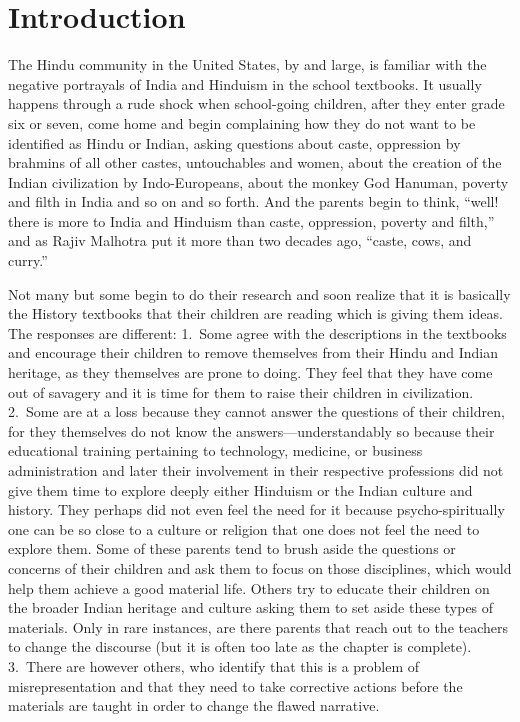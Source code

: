 \chapter*{Introduction}


The Hindu community in the United States, by and large, is familiar with the negative portrayals of India and Hinduism in the school textbooks. It usually happens through a rude shock when school-going children, after they enter grade six or seven, come home and begin complaining how they do not want to be identified as Hindu or Indian, asking questions about caste, oppression by brahmins of all other castes, untouchables and women, about the creation of the Indian civilization by Indo-Europeans, about the monkey God Hanuman, poverty and filth in India and so on and so forth. And the parents begin to think, “well! there is more to India and Hinduism than caste, oppression, poverty and filth,” and as Rajiv Malhotra put it more than two decades ago, “caste, cows, and curry.”

Not many but some begin to do their research and soon realize that it is basically the History textbooks that their children are reading which is giving them ideas. The responses are different: 1.\ Some agree with the descriptions in the textbooks and encourage their children to remove themselves from their Hindu and Indian heritage, as they themselves are prone to doing. They feel that they have come out of savagery and it is time for them to raise their children in civilization. 2.\ Some are at a loss because they cannot answer the questions of their children, for they themselves do not know the answers—understandably so because their educational training pertaining to technology, medicine, or business administration and later their involvement in their respective professions did not give them time to explore deeply either Hinduism or the Indian culture and history. They perhaps did not even feel the need for it because psycho-spiritually one can be so close to a culture or religion that one does not feel the need to explore them. Some of these parents tend to brush aside the questions or concerns of their children and ask them to focus on those disciplines, which would help them achieve a good material life. Others try to educate their children on the broader Indian heritage and culture asking them to set aside these types of materials. Only in rare instances, are there parents that reach out to the teachers to change the discourse (but it is often too late as the chapter is complete). 3.\ There are however others, who identify that this is a problem of misrepresentation and that they need to take corrective actions before the materials are taught in order to change the flawed narrative. 

